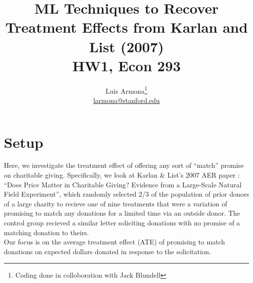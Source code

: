 \documentclass{article}
\begin{document}
\title{ML Techniques to Recover Treatment Effects from Karlan and List (2007) \\ HW1, Econ 293}
\author{Luis Armona\footnote{Coding done in colloboration with Jack Blundell} \\ \href{mailto:larmona@stanford.edu}{larmona@stanford.edu} }
\maketitle

\section{Setup}
Here, we investigate the treatment effect of offering any sort of ``match'' promise on charitable giving. Specifically, we look at Karlan \& List's 2007 AER paper : ``Does Price Matter in Charitable Giving? Evidence from a Large-Scale Natural Field Experiment'', which randomly selected 2/3 of the population of prior donors of a large charity to recieve one of nine treatments that were a variation of promising to match any donations for a limited time via an outside donor. The control group recieved a similar letter soliciting donations with no promise of a matching donation to theirs. \\ \indent
Our focus is on the average treatment effect (ATE) of promising to match donations on expected dollars donated in response to the solicitation.
\end{document}
